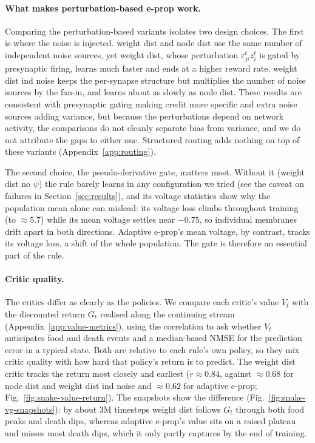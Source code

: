 \documentclass[10pt,twocolumn]{article}
\newcommand{\method}{perturbation-based e-prop}   %
\newcommand{\variant}[1]{\textsf{#1}} %
\begin{document}
\paragraph{What makes \method{} work.}
Comparing the perturbation-based variants isolates two design choices. The first is
where the noise is injected. \variant{weight dist} and \variant{node dist} use
the same number of independent noise sources, yet \variant{weight dist}, whose
perturbation $\varepsilon^t_{ji}z^t_i$ is gated by presynaptic firing, learns
much faster and ends at a higher reward rate. \variant{weight dist ind noise}
keeps the per-synapse structure but multiplies the number of noise sources by
the fan-in, and learns about as slowly as \variant{node dist}. These results are
consistent with presynaptic gating making credit more specific and extra noise
sources adding variance, but because the perturbations depend on network
activity, the comparisons do not cleanly separate bias from variance, and we do
not attribute the gaps to either one. Structured routing adds nothing on top of
these variants (Appendix~\ref{app:routing}).

The second choice, the pseudo-derivative gate, matters most. Without it
(\variant{weight dist no $\psi$}) the rule barely learns in any configuration
we tried (see the caveat on failures in Section~\ref{sec:results}), and its voltage
statistics show why the population mean alone can mislead: its voltage loss
climbs throughout training (to $\approx 5.7$) while its mean voltage settles
near $-0.75$, so individual membranes drift apart in both directions. Adaptive
e-prop's mean voltage, by contrast, tracks its voltage loss, a shift of the
whole population. The gate is therefore an essential part of the rule.

\paragraph{Critic quality.}
The critics differ as clearly as the policies. We compare each critic's value
$V_t$ with the discounted return $G_t$ realised along the continuing stream
(Appendix~\ref{app:value-metrics}), using the correlation to ask whether $V_t$
anticipates food and death events and a median-based NMSE for the prediction
error in a typical state. Both are relative to each rule's own policy, so they
mix critic quality with how hard that policy's return is to predict. The
\variant{weight dist} critic tracks the return most closely and earliest
($r\approx 0.84$, against $\approx 0.68$ for \variant{node dist} and
\variant{weight dist ind noise} and $\approx 0.62$ for adaptive e-prop;
Fig.~\ref{fig:snake-value-return}). The snapshots show the difference
(Fig.~\ref{fig:snake-vg-snapshots}): by about 3M timesteps \variant{weight dist}
follows $G_t$ through both food peaks and death dips, whereas adaptive e-prop's
value sits on a raised plateau and misses most death dips, which it only partly
captures by the end of training.
\end{document}
